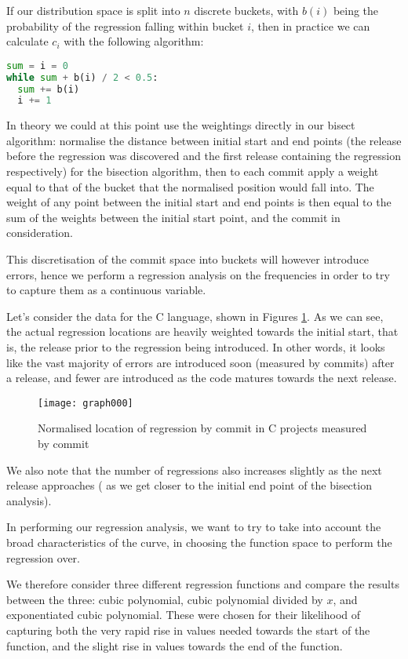 \documentclass[10pt,journal,compsoc]{IEEEtran}
\begin{document}
If our distribution space is split into $n$ discrete buckets, with $b(i)$ being the probability of the regression falling within bucket $i$, then in practice we can calculate $c_i$ with the following algorithm:

\begin{lstlisting}[language=Python]
sum = i = 0
while sum + b(i) / 2 < 0.5:
  sum += b(i)
  i += 1
\end{lstlisting}

In theory we could at this point use the weightings directly in our bisect algorithm: normalise the distance between initial start and end points (the release before the regression was discovered and the first release containing the regression respectively) for the bisection algorithm, then to each commit apply a weight equal to that of the bucket that the normalised position would fall into. The weight of any point between the initial start and end points is then equal to the sum of the weights between the initial start point, and the commit in consideration.

This discretisation of the commit space into buckets will however introduce errors, hence we perform a regression analysis on the frequencies in order to try to capture them as a continuous variable.

Let's consider the data for the C language, shown in Figures \ref{fig:c-commits}. As we can see, the actual regression locations are heavily weighted towards the initial start, that is, the release prior to the regression being introduced. In other words, it looks like the vast majority of errors are introduced soon (measured by commits) after a release, and fewer are introduced as the code matures towards the next release.

\begin{figure}[t]
\centering
\texttt{[image: graph000]}%
\caption{\label{fig:c-commits}Normalised location of regression by commit in C projects measured by commit}
\end{figure}

We also note that the number of regressions also increases slightly as the next release approaches (\ie\/ as we get closer to the initial end point of the bisection analysis).

In performing our regression analysis, we want to try to take into account the broad characteristics of the curve, in choosing the function space to perform the regression over.

We therefore consider three different regression functions and compare the results between the three: cubic polynomial, cubic polynomial divided by $x$, and exponentiated cubic polynomial. These were chosen for their likelihood of capturing both the very rapid rise in values needed towards the start of the function, and the slight rise in values towards the end of the function.
\end{document}
